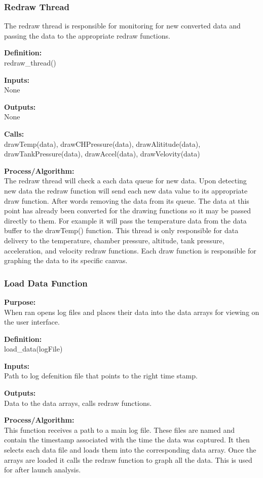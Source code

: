 \documentclass[10pt,draftclsnofoot,onecolumn,compsoc]{IEEEtran}
\begin{document}
\subsubsection{Redraw Thread}
The redraw thread is responsible for monitoring for new converted data and passing the data to the appropriate redraw functions.\par
{\bf Definition:} \\
redraw\_thread() \par
{\bf Inputs:} \\  None \par
{\bf Outputs:} \\ None \par
{\bf Calls:} \\ drawTemp(data), drawCHPressure(data), drawAlititude(data), drawTankPressure(data), drawAccel(data), drawVelovity(data) \par
{\bf Process/Algorithm:} \\
The redraw thread will check a each data queue for new data. Upon detecting new data the redraw function will send each new data value to its appropriate draw function. After words removing the data from its queue. The data at this point has already been converted for the drawing functions so it may be passed directly to them. For example it will pass the temperature data from the data buffer to the drawTemp() function. This thread is only responsible for data delivery to the temperature, chamber pressure, altitude, tank pressure, acceleration, and velocity redraw functions. Each draw function is responsible for graphing the data to its specific canvas.\par

\subsubsection{Load Data Function}
{\bf Purpose:} \\
When ran opens log files and places their data into the data arrays for viewing on the user interface. \par
{\bf Definition:} \\ 
load\_data(logFile) \par
{\bf Inputs:} \\ Path to log defenition file that points to the right time stamp. \par
{\bf Outputs:} \\ Data to the data arrays, calls redraw functions. \par
{\bf Process/Algorithm:} \\
This function receives a path to a main log file. These files are named and contain the timestamp associated with the time the data was captured. It then selects each data file and loads them into the corresponding data array. Once the arrays are loaded it calls the redraw function to graph all the data. This is used for after launch analysis.\par
\end{document}
